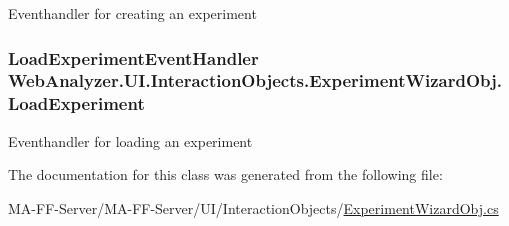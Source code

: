 Eventhandler for creating an experiment 

\hypertarget{class_web_analyzer_1_1_u_i_1_1_interaction_objects_1_1_experiment_wizard_obj_a4ab54f4e59198b7ff3e9b91ad5049642}{}
\subsubsection[{Load\+Experiment}]{\setlength{\rightskip}{0pt plus 5cm}Load\+Experiment\+Event\+Handler Web\+Analyzer.\+U\+I.\+Interaction\+Objects.\+Experiment\+Wizard\+Obj.\+Load\+Experiment}\label{class_web_analyzer_1_1_u_i_1_1_interaction_objects_1_1_experiment_wizard_obj_a4ab54f4e59198b7ff3e9b91ad5049642}


Eventhandler for loading an experiment 



The documentation for this class was generated from the following file\+:\begin{DoxyCompactItemize}
\item 
M\+A-\/\+F\+F-\/\+Server/\+M\+A-\/\+F\+F-\/\+Server/\+U\+I/\+Interaction\+Objects/\hyperlink{_experiment_wizard_obj_8cs}{Experiment\+Wizard\+Obj.\+cs}\end{DoxyCompactItemize}
